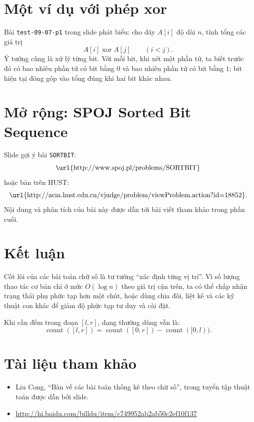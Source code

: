 \documentclass[11pt]{article}
\begin{document}
\section{Một ví dụ với phép xor}

Bài \texttt{test-09-07-p1} trong slide phát biểu: cho dãy $A[i]$ độ dài $n$,
tính tổng các giá trị
\[
  A[i]\operatorname{xor}A[j]\qquad (i<j).
\]
Ý tưởng cũng là xử lý từng bit. Với mỗi bit, khi xét một phần tử, ta biết
trước đó có bao nhiêu phần tử có bit bằng $0$ và bao nhiêu phần tử có bit
bằng $1$; bit hiện tại đóng góp vào tổng đúng khi hai bit khác nhau.

\section{Mở rộng: SPOJ Sorted Bit Sequence}

Slide gợi ý bài \texttt{SORTBIT}:
\[
  \text{\url{http://www.spoj.pl/problems/SORTBIT}}
\]
hoặc bản trên HUST:
\[
  \text{\url{http://acm.hust.edu.cn/vjudge/problem/viewProblem.action?id=18852}}.
\]
Nội dung và phân tích của bài này được dẫn tới bài viết tham khảo trong phần
cuối.

\section{Kết luận}

Cốt lõi của các bài toán chữ số là tư tưởng ``xác định từng vị trí''. Vì số
lượng thao tác cơ bản chỉ ở mức $O(\log n)$ theo giá trị cận trên, ta có thể
chấp nhận trạng thái phụ phức tạp hơn một chút, hoặc dùng chia đôi, liệt kê
và các kỹ thuật con khác để giảm độ phức tạp tư duy và cài đặt.

Khi cần đếm trong đoạn $[l,r]$, dạng thường dùng vẫn là:
\[
  \operatorname{count}([l,r])
  =\operatorname{count}([0,r])-\operatorname{count}([0,l)).
\]

\section*{Tài liệu tham khảo}

\begin{itemize}
  \item Liu Cong, ``Bàn về các bài toán thống kê theo chữ số'', trong tuyển
  tập thuật toán được dẫn bởi slide.
  \item \url{http://hi.baidu.com/billdu/item/c749952ab2ab50c2ef10f137}
\end{itemize}
\end{document}
